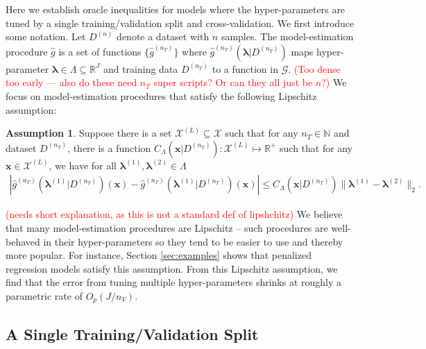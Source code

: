 \documentclass[12pt]{article} %
\theoremstyle{definition}
\newtheorem{assump}{Assumption}
\begin{document}
Here we establish oracle inequalities for models where the hyper-parameters are tuned by a single training/validation split and cross-validation. We first introduce some notation.
Let $D^{(n)}$ denote a dataset with $n$ samples. The model-estimation procedure $\hat{g}$ is a set of functions $\{\hat{g}^{(n_T)}\}$ where $\hat{g}^{(n_T)}(\boldsymbol{\lambda} | D^{(n_T)})$ maps hyper-parameter $\boldsymbol{\lambda} \in \Lambda \subseteq \mathbb{R}^J$ and training data $D^{(n_T)}$ to a function in $\mathcal{G}$. \textcolor{red}{(Too dense too early --- also do these need $n_T$ super scripts? Or can they all just be $n$?)}
We focus on model-estimation procedures that satisfy the following Lipschitz assumption:
\begin{assump}
	\label{assump:lipschitz}
	Suppose there is a set $\mathcal{X}^{(L)} \subseteq \mathcal{X}$ such that for any $n_T \in \mathbb{N}$ and dataset $D^{(n_T)}$, there is a function $C_\Lambda(\boldsymbol{x} | D^{(n_T)}) : \mathcal{X}^{(L)} \mapsto \mathbb{R}^+$ such that for any $\boldsymbol{x} \in \mathcal{X}^{(L)}$, we have for all $\boldsymbol{\lambda}^{(1)}, \boldsymbol{\lambda}^{(2)} \in \Lambda$
	\begin{align}
	\left |
	\hat{g}^{(n_T)}(\boldsymbol{\lambda}^{(1)}|D^{(n_T)})(\boldsymbol{x}) - \hat{g}^{(n_T)}(\boldsymbol{\lambda}^{(1)}|D^{(n_T)})(\boldsymbol{x}) \right |
	\le C_\Lambda(\boldsymbol{x}|D^{(n_T)}) \|\boldsymbol{\lambda}^{(1)} - \boldsymbol{\lambda}^{(2)}\|_2.
	\end{align}
\end{assump}
\textcolor{red}{(needs short explanation, as this is not a standard def of lipshchitz)}
\noindent
We believe that many model-estimation procedures are Lipschitz -- such procedures are well-behaved in their hyper-parameters so they tend to be easier to use and thereby more popular.
For instance, Section \ref{sec:examples} shows that penalized regression models satisfy this assumption.
From this Lipschitz assumption, we find that the error from tuning multiple hyper-parameters shrinks at roughly a parametric rate of $O_p(J/n_V)$.

\subsection{A Single Training/Validation Split}\label{sec:single}
\end{document}
